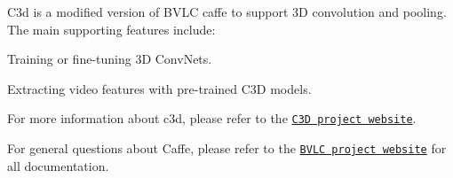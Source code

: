 C3d is a modified version of B\-V\-L\-C caffe to support 3\-D convolution and pooling. The main supporting features include\-:\par

\begin{DoxyItemize}
\item Training or fine-\/tuning 3\-D Conv\-Nets.\par

\item Extracting video features with pre-\/trained C3\-D models.\par

\end{DoxyItemize}

For more information about c3d, please refer to the \href{http://www.cs.dartmouth.edu/~dutran/c3d}{\tt C3\-D project website}.\par


For general questions about Caffe, please refer to the \href{http://caffe.berkeleyvision.org}{\tt B\-V\-L\-C project website} for all documentation. 